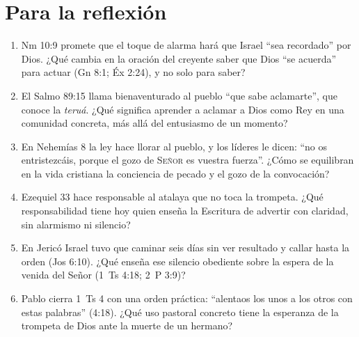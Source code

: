 \documentclass[11pt,letterpaper]{article}
\newcommand{\SENOR}{\textsc{Señor}}
\begin{document}
\section{Para la reflexión}

\begin{enumerate}\setlength{\itemsep}{3pt}
\item Nm 10:9 promete que el toque de alarma hará que Israel ``sea recordado'' por Dios. ¿Qué cambia en la oración del creyente saber que Dios ``se acuerda'' para actuar (Gn 8:1; Éx 2:24), y no solo para saber?
\item El Salmo 89:15 llama bienaventurado al pueblo ``que sabe aclamarte'', que conoce la \emph{teruá}. ¿Qué significa aprender a aclamar a Dios como Rey en una comunidad concreta, más allá del entusiasmo de un momento?
\item En Nehemías 8 la ley hace llorar al pueblo, y los líderes le dicen: ``no os entristezcáis, porque el gozo de \SENOR{} es vuestra fuerza''. ¿Cómo se equilibran en la vida cristiana la conciencia de pecado y el gozo de la convocación?
\item Ezequiel 33 hace responsable al atalaya que no toca la trompeta. ¿Qué responsabilidad tiene hoy quien enseña la Escritura de advertir con claridad, sin alarmismo ni silencio?
\item En Jericó Israel tuvo que caminar seis días sin ver resultado y callar hasta la orden (Jos 6:10). ¿Qué enseña ese silencio obediente sobre la espera de la venida del Señor (1~Ts 4:18; 2~P 3:9)?
\item Pablo cierra 1~Ts 4 con una orden práctica: ``alentaos los unos a los otros con estas palabras'' (4:18). ¿Qué uso pastoral concreto tiene la esperanza de la trompeta de Dios ante la muerte de un hermano?
\end{enumerate}

\end{document}
